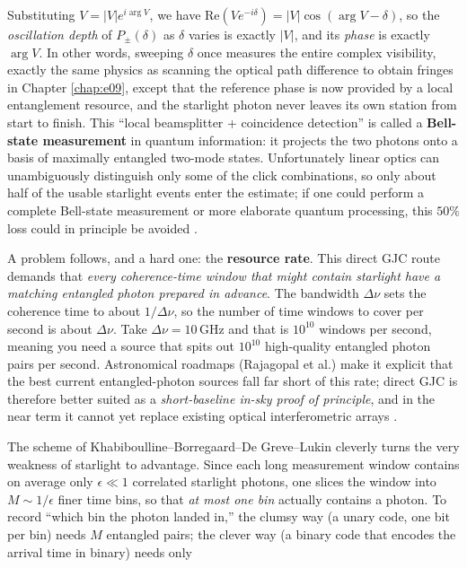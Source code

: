 Substituting \(V=|V|e^{i\arg V}\), we have \(\mathrm{Re}(Ve^{-i\delta})=|V|\cos(\arg V-\delta)\), so the \emph{oscillation depth} of \(P_\pm(\delta)\) as \(\delta\) varies is exactly \(|V|\), and its \emph{phase} is exactly \(\arg V\). In other words, sweeping \(\delta\) once measures the entire complex visibility, exactly the same physics as scanning the optical path difference to obtain fringes in Chapter \ref{chap:e09}, except that the reference phase is now provided by a local entanglement resource, and the starlight photon never leaves its own station from start to finish. This ``local beamsplitter + coincidence detection'' is called a \textbf{Bell-state measurement} in quantum information: it projects the two photons onto a basis of maximally entangled two-mode states. Unfortunately linear optics can unambiguously distinguish only some of the click combinations, so only about half of the usable starlight events enter the estimate; if one could perform a complete Bell-state measurement or more elaborate quantum processing, this \(50\%\) loss could in principle be avoided \citep{1982Natur.299..802W,1993PhRvL..70.1895B,2012PhRvL.109g0503G}.

A problem follows, and a hard one: the \textbf{resource rate}. This direct GJC route demands that \emph{every coherence-time window that might contain starlight have a matching entangled photon prepared in advance}. The bandwidth \(\Delta\nu\) sets the coherence time to about \(1/\Delta\nu\), so the number of time windows to cover per second is about \(\Delta\nu\). Take \(\Delta\nu=10\,\mathrm{GHz}\) and that is \(10^{10}\) windows per second, meaning you need a source that spits out \(10^{10}\) high-quality entangled photon pairs per second. Astronomical roadmaps (Rajagopal et al.) make it explicit that the best current entangled-photon sources fall far short of this rate; direct GJC is therefore better suited as a \emph{short-baseline in-sky proof of principle}, and in the near term it cannot yet replace existing optical interferometric arrays \citep{2024SPIE13095E..1NR,2012PhRvL.109g0503G}.

The scheme of Khabiboulline--Borregaard--De Greve--Lukin cleverly turns the very weakness of starlight to advantage. Since each long measurement window contains on average only \(\epsilon\ll1\) correlated starlight photons, one slices the window into \(M\sim1/\epsilon\) finer time bins, so that \emph{at most one bin} actually contains a photon. To record ``which bin the photon landed in,'' the clumsy way (a unary code, one bit per bin) needs \(M\) entangled pairs; the clever way (a binary code that encodes the arrival time in binary) needs only


